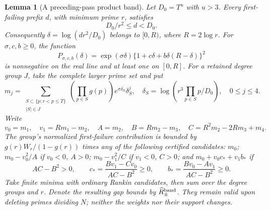 \documentclass[11pt]{article}
\newtheorem{lemma}[theorem]{Lemma}
\begin{document}
\begin{lemma}[A preceding-pass product band]\label{lem:prefixband}
Let $D_0=T^u$ with $u>3$. Every first-failing prefix $d$,
with minimum prime $r$, satisfies
\[
D_0/r^2\le d<D_0.
\]
Consequently $\delta=\log(dr^2/D_0)$ belongs to $[0,R)$,
where $R=2\log r$. For $\sigma,c,b\ge0$, the function
\[
P_{\sigma,c,b}(\delta)
 =\exp(\sigma\delta)\{1+c\delta+b\delta(R-\delta)\}^2
\]
is nonnegative on the real line and at least one on $[0,R]$.
For a retained degree group $J$, take the complete larger prime set
and put
\[
m_j=\sum_{\substack{S\subset\{p:r<p\le T\}\\ |S|\in J}}
 \left(\prod_{p\in S}g(p)\right)e^{\sigma\delta_S}\delta_S^j,\quad
\delta_S=\log(r^3\prod_{p\in S}p/D_0),\quad 0\le j\le4.
\]
Write
\[
v_0=m_1,\quad v_1=Rm_1-m_2,\quad
A=m_2,\quad B=Rm_2-m_3,\quad
C=R^2m_2-2Rm_3+m_4.
\]
The group's normalized first-failure contribution is bounded by
$g(r)W_r/(1-g(r))$ times any of the following certified candidates:
$m_0$; $m_0-v_0^2/A$ if $v_0<0$, $A>0$;
$m_0-v_1^2/C$ if $v_1<0$, $C>0$; and
$m_0+v_0c_*+v_1b_*$ if
\[
AC-B^2>0,\qquad
c_*=\frac{Bv_1-Cv_0}{AC-B^2}\ge0,\qquad
b_*=\frac{Bv_0-Av_1}{AC-B^2}\ge0.
\]
Take finite minima with ordinary Rankin candidates, then sum over
the degree groups and $r$. Denote the resulting gap bounds by
$\widehat R^{\rm band}_\pm$. They remain valid upon deleting primes
dividing $N$; neither the weights nor their support changes.
\end{lemma}
\end{document}
